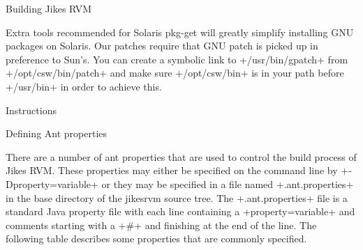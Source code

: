 \begin{section}{Building Jikes RVM}
\begin{subsubsection}{Extra tools recommended for Solaris}
pkg-get will greatly simplify installing GNU packages on Solaris. Our patches require that GNU patch is picked up in preference to Sun's. You can create a symbolic link to \spverb+/usr/bin/gpatch+ from \spverb+/opt/csw/bin/patch+ and make sure \spverb+/opt/csw/bin+ is in your path before \spverb+/usr/bin+ in order to achieve this.

\end{subsubsection}

\begin{subsection}{Instructions}

\begin{subsubsection}{Defining Ant properties}

There are a number of ant properties that are used to control the build process of Jikes RVM. These properties may either be specified on the command line by \spverb+-Dproperty=variable+ or they may be specified in a file named \spverb+.ant.properties+ in the base directory of the jikesrvm source tree. The \spverb+.ant.properties+ file is a standard Java property file with each line containing a \spverb+property=variable+ and comments starting with a \spverb+#+ and finishing at the end of the line. The following table describes some properties that are commonly specified.



\end{subsubsection}
\end{subsection}
\end{section}
